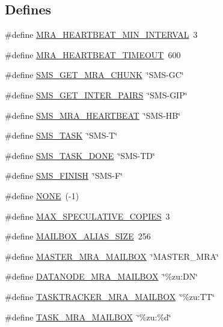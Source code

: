 \subsection*{\-Defines}
\begin{DoxyCompactItemize}
\item 
\#define \hyperlink{common-mra_8h_a85026a76b45b05d1b98bb9a1d1ea5385}{\-M\-R\-A\-\_\-\-H\-E\-A\-R\-T\-B\-E\-A\-T\-\_\-\-M\-I\-N\-\_\-\-I\-N\-T\-E\-R\-V\-A\-L}~3
\item 
\#define \hyperlink{common-mra_8h_a2f68e94ff27ef3f63e98127818653e8f}{\-M\-R\-A\-\_\-\-H\-E\-A\-R\-T\-B\-E\-A\-T\-\_\-\-T\-I\-M\-E\-O\-U\-T}~600
\item 
\#define \hyperlink{common-mra_8h_ae17048f0a7244495add2d7bff7575b46}{\-S\-M\-S\-\_\-\-G\-E\-T\-\_\-\-M\-R\-A\-\_\-\-C\-H\-U\-N\-K}~\char`\"{}\-S\-M\-S-\/\-G\-C\char`\"{}
\item 
\#define \hyperlink{common-mra_8h_a82851de4a0b4080ee2fc4912bd5016c1}{\-S\-M\-S\-\_\-\-G\-E\-T\-\_\-\-I\-N\-T\-E\-R\-\_\-\-P\-A\-I\-R\-S}~\char`\"{}\-S\-M\-S-\/\-G\-I\-P\char`\"{}
\item 
\#define \hyperlink{common-mra_8h_aebb6b4972f6981a2c42945cc316fe2b5}{\-S\-M\-S\-\_\-\-M\-R\-A\-\_\-\-H\-E\-A\-R\-T\-B\-E\-A\-T}~\char`\"{}\-S\-M\-S-\/\-H\-B\char`\"{}
\item 
\#define \hyperlink{common-mra_8h_ae4152c1438f315591b56474d71caf421}{\-S\-M\-S\-\_\-\-T\-A\-S\-K}~\char`\"{}\-S\-M\-S-\/\-T\char`\"{}
\item 
\#define \hyperlink{common-mra_8h_a9872fc42f34693ee8407d6cee43765ac}{\-S\-M\-S\-\_\-\-T\-A\-S\-K\-\_\-\-D\-O\-N\-E}~\char`\"{}\-S\-M\-S-\/\-T\-D\char`\"{}
\item 
\#define \hyperlink{common-mra_8h_a441ebd93e24154f16983c901b282ebff}{\-S\-M\-S\-\_\-\-F\-I\-N\-I\-S\-H}~\char`\"{}\-S\-M\-S-\/\-F\char`\"{}
\item 
\#define \hyperlink{common-mra_8h_a655c84af1b0034986ff56e12e84f983d}{\-N\-O\-N\-E}~(-\/1)
\item 
\#define \hyperlink{common-mra_8h_a3a11044774f43ab067a966d654bc1fa8}{\-M\-A\-X\-\_\-\-S\-P\-E\-C\-U\-L\-A\-T\-I\-V\-E\-\_\-\-C\-O\-P\-I\-E\-S}~3
\item 
\#define \hyperlink{common-mra_8h_afaa0d742cbc433ed6d7dbb10dfd94670}{\-M\-A\-I\-L\-B\-O\-X\-\_\-\-A\-L\-I\-A\-S\-\_\-\-S\-I\-Z\-E}~256
\item 
\#define \hyperlink{common-mra_8h_a7648dbffbb9dd848a40b7c76cf5e4223}{\-M\-A\-S\-T\-E\-R\-\_\-\-M\-R\-A\-\_\-\-M\-A\-I\-L\-B\-O\-X}~\char`\"{}\-M\-A\-S\-T\-E\-R\-\_\-\-M\-R\-A\char`\"{}
\item 
\#define \hyperlink{common-mra_8h_a03ecfabdf95bb7456f21bcd120c76665}{\-D\-A\-T\-A\-N\-O\-D\-E\-\_\-\-M\-R\-A\-\_\-\-M\-A\-I\-L\-B\-O\-X}~\char`\"{}\%zu\-:\-D\-N\char`\"{}
\item 
\#define \hyperlink{common-mra_8h_a1366ac09f7a23b1235da07586d163ebe}{\-T\-A\-S\-K\-T\-R\-A\-C\-K\-E\-R\-\_\-\-M\-R\-A\-\_\-\-M\-A\-I\-L\-B\-O\-X}~\char`\"{}\%zu\-:\-T\-T\char`\"{}
\item 
\#define \hyperlink{common-mra_8h_ae559bdca40b1742557e7cebb210c8959}{\-T\-A\-S\-K\-\_\-\-M\-R\-A\-\_\-\-M\-A\-I\-L\-B\-O\-X}~\char`\"{}\%zu\-:\%d\char`\"{}
\end{DoxyCompactItemize}
